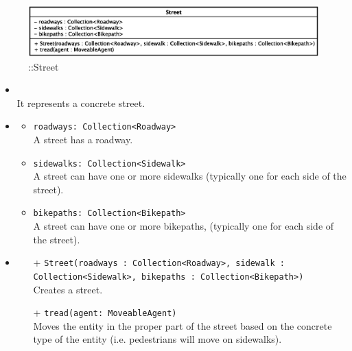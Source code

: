 \begin{figure}[h]
\centering
\includegraphics[scale=0.6,keepaspectratio]{images/solution/app/backend/street.eps}
\caption{\pReactiveComponent::Street}
\label{fig:sd-app-street}
\end{figure}
\FloatBarrier
\begin{itemize}
  \item \textbf{\descr} \\
    It represents a concrete street.
  \item \textbf{\attrs}
  \begin{itemize}
    \item \texttt{roadways: Collection<Roadway>} \\
A street has a roadway.
    \item \texttt{sidewalks: Collection<Sidewalk>} \\
A street can have one or more sidewalks (typically one for each side
of the street).
    \item \texttt{bikepaths: Collection<Bikepath>} \\
A street can have one or more bikepaths, (typically one for each side
of the street).
  \end{itemize}
  \item \textbf{\ops}
  \begin{itemize}
  \item[+] \texttt{Street(roadways : Collection<Roadway>, sidewalk : Collection<Sidewalk>, bikepaths : Collection<Bikepath>)} \\
    Creates a street.
    \item[+] \texttt{tread(agent: MoveableAgent)} \\
Moves the entity in the proper part of the street based on the
concrete type of the entity (i.e. pedestrians will move on sidewalks).
  \end{itemize}
\end{itemize}
